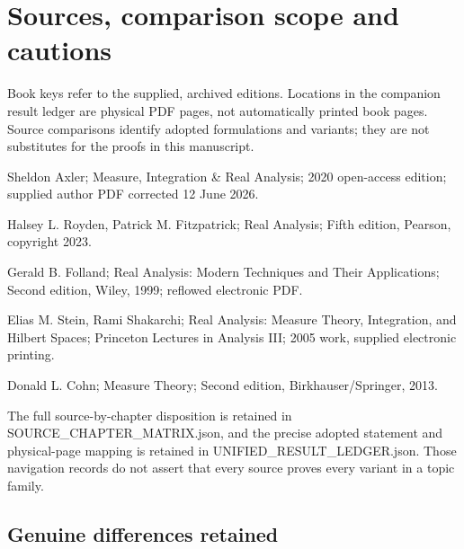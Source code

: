 \documentclass[11pt,oneside,openany]{book}
\theoremstyle{definition}
\theoremstyle{remark}
\begin{document}

\backmatter

\chapter*{Sources, comparison scope and cautions}


Book keys refer to the supplied, archived editions. Locations in the companion result ledger are physical PDF pages, not automatically printed book pages. Source comparisons identify adopted formulations and variants; they are not substitutes for the proofs in this manuscript.

\begin{description}[style=nextline,leftmargin=13mm]

\item[AXL] Sheldon Axler; Measure, Integration \& Real Analysis; 2020 open-access edition; supplied author PDF corrected 12 June 2026.

\item[ROY] Halsey L. Royden, Patrick M. Fitzpatrick; Real Analysis; Fifth edition, Pearson, copyright 2023.

\item[FOL] Gerald B. Folland; Real Analysis: Modern Techniques and Their Applications; Second edition, Wiley, 1999; reflowed electronic PDF.

\item[STE] Elias M. Stein, Rami Shakarchi; Real Analysis: Measure Theory, Integration, and Hilbert Spaces; Princeton Lectures in Analysis III; 2005 work, supplied electronic printing.

\item[COH] Donald L. Cohn; Measure Theory; Second edition, Birkhauser/Springer, 2013.

\end{description}

The full source-by-chapter disposition is retained in SOURCE\_CHAPTER\_MATRIX.json, and the precise adopted statement and physical-page mapping is retained in UNIFIED\_RESULT\_LEDGER.json. Those navigation records do not assert that every source proves every variant in a topic family.

\section*{Genuine differences retained}
\end{document}
